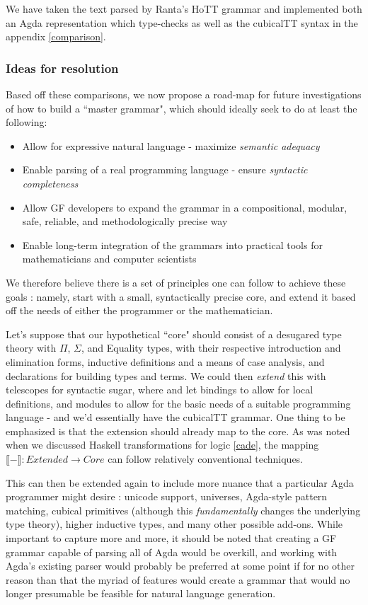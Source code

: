 We have taken the text parsed by Ranta's HoTT grammar and implemented both an
Agda representation which type-checks as well as the cubicalTT syntax in the
appendix \ref{comparison}.

\subsubsection{Ideas for resolution}

Based off these comparisons, we now propose a road-map for future investigations 
of how to build a ``master grammar", which should ideally seek to do at least the following:

\begin{itemize}
\item Allow for expressive natural language - maximize \emph{semantic adequacy}
\item Enable parsing of a real programming language - ensure \emph{syntactic completeness}
\item Allow GF developers to expand the grammar in a compositional, modular, safe, reliable,
  and methodologically precise way
\item Enable long-term integration of the grammars into practical tools for
  mathematicians and computer scientists
\end{itemize}

We therefore believe there is a set of principles one can follow to achieve
these goals : namely, start with a small, syntactically precise core, and extend
it based off the needs of either the programmer or the mathematician.

Let's suppose that our hypothetical ``core" should consist of a desugared type
theory with $\Pi$, $\Sigma$, and Equality types, with their respective
introduction and elimination forms, inductive definitions and a means of case
analysis, and declarations for building types and terms. We could then
\emph{extend} this with telescopes for syntactic sugar, where and let bindings
to allow for local definitions, and modules to allow for the basic needs of a
suitable programming language - and we'd essentially have the cubicalTT grammar.
One thing to be emphasized is that the extension should already map to the core.
As was noted when we discussed Haskell transformations for logic \ref{cade}, the
mapping $\llbracket - \rrbracket : Extended \to Core$ can follow relatively
conventional techniques.

This can then be extended again to include more nuance that a particular Agda programmer
might desire : unicode support, universes, Agda-style pattern matching, cubical
primitives (although this \emph{fundamentally} changes the underlying type
theory), higher inductive types, and many other possible add-ons. While
important to capture more and more, it should be noted that creating a GF
grammar capable of parsing all of Agda would be overkill, and working with
Agda's existing parser would probably be preferred at some point if for no other
reason than that the myriad of features would create a grammar that would no
longer presumable be feasible for natural language generation.

